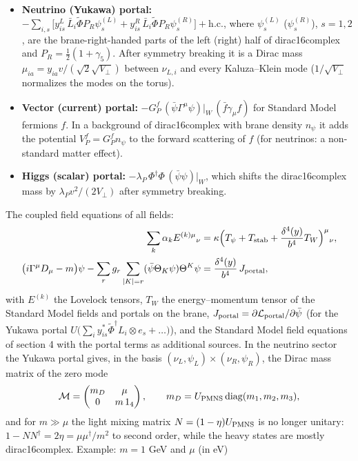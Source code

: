 \documentclass[10pt,a4paper]{article}
\begin{document}
\begin{itemize}
\item \textbf{Neutrino (Yukawa) portal:} $-\sum_{i,s}\big[y^L_{is}\,\bar L_i\tilde\Phi P_R\psi^{(L)}_s+y^R_{is}\,\bar L_i\tilde\Phi P_R\psi^{(R)}_s\big]+\mathrm{h.c.}$, where $\psi^{(L)}_s$ ($\psi^{(R)}_s$), $s=1,2$, are the brane-right-handed parts of the left (right) half of dirac16complex and $P_R=\frac12(1+\gamma_5)$. After symmetry breaking it is a Dirac mass $\mu_{ia}=y_{ia}v/(\sqrt2\sqrt{V_\perp})$ between $\nu_{L,i}$ and every Kaluza–Klein mode ($1/\sqrt{V_\perp}$ normalizes the modes on the torus).
\item \textbf{Vector (current) portal:} $-G^f_P\,(\bar\psi\Gamma^\mu\psi)|_W\,(\bar f\gamma_\mu f)$ for Standard Model fermions $f$. In a background of dirac16complex with brane density $n_\psi$ it adds the potential $V^f_P=G^f_Pn_\psi$ to the forward scattering of $f$ (for neutrinos: a non-standard matter effect).
\item \textbf{Higgs (scalar) portal:} $-\lambda_P\,\Phi^\dagger\Phi\,(\bar\psi\psi)|_W$, which shifts the dirac16complex mass by $\lambda_Pv^2/(2V_\perp)$ after symmetry breaking.
\end{itemize}
The coupled field equations of all fields:
\begin{align*}
\sum_k\alpha_kE^{(k)\mu}{}_\nu&=\kappa\Big(T_\psi+T_{\rm stab}+\frac{\delta^4(y)}{b^4}T_W\Big)^\mu{}_\nu, \\
\big(i\Gamma^\mu D_\mu-m\big)\psi-\sum_rg_r\sum_{|K|=r}(\bar\psi\Theta_K\psi)\Theta^K\psi&=\frac{\delta^4(y)}{b^4}\,J_{\rm portal},
\end{align*}
with $E^{(k)}$ the Lovelock tensors, $T_W$ the energy–momentum tensor of the Standard Model fields and portals on the brane, $J_{\rm portal}=\partial\mathcal L_{\rm portal}/\partial\bar\psi$ (for the Yukawa portal $U\big(\sum_{i}y^*_{is}\tilde\Phi^\dagger L_i\otimes e_s+\dots\big)$), and the Standard Model field equations of section 4 with the portal terms as additional sources. In the neutrino sector the Yukawa portal gives, in the basis $(\nu_L,\psi_L)\times(\nu_R,\psi_R)$, the Dirac mass matrix of the zero mode
\begin{equation*}
\mathcal M=\begin{pmatrix}m_D&\mu\\0&m\,1_4\end{pmatrix},\qquad m_D=U_{\rm PMNS}\,\mathrm{diag}(m_1,m_2,m_3),
\end{equation*}
and for $m\gg\mu$ the light mixing matrix $N=(1-\eta)U_{\rm PMNS}$ is no longer unitary: $1-NN^\dagger=2\eta=\mu\mu^\dagger/m^2$ to second order, while the heavy states are mostly dirac16complex. Example: $m=1$ GeV and $\mu$ (in eV)
\end{document}
